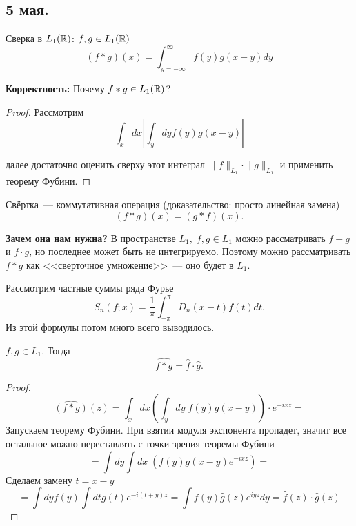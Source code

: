 \subsection{ 5 мая. }


\begin{definition}
    Сверка в $L_1(\mathbb{R})$: $f, g \in L_1(\mathbb{R})$
    \[ (f * g)(x) = \int_{y=-\infty}^{\infty} f(y)g(x-y)dy\]
\end{definition}

\begin{note}
    \textbf{Корректность:} Почему $f * g \in L_1(\mathbb{R})$?
\end{note}

\begin{proof}
Рассмотрим
\[
\int_x dx \left| \int_y dy f(y) g(x - y) \right|
\]

далее достаточно оценить сверху этот интеграл $\|f\|_{L_1} \cdot \|g\|_{L_1}$ и применить теорему Фубини.
\end{proof}

\begin{statement}
    Свёртка~--- коммутативная операция (доказательство: просто линейная замена)
    \[(f*g)(x) = (g * f)(x).\]
\end{statement}

\begin{note}
\textbf{Зачем она нам нужна?} В пространстве $L_1, \; f, g \in L_1$ можно рассматривать $f + g$ и $f \cdot g$, но последнее может быть не интегрируемо. Поэтому можно рассматривать $f * g$ как <<сверточное умножение>>~--- оно будет в $L_1$.
\end{note}

\begin{example}
    Рассмотрим частные суммы ряда Фурье \[S_n(f; x) = \frac{1}{\pi} \int_{-\pi}^{\pi}D_n(x-t)f(t)dt.\]
    Из этой формулы потом много всего выводилось.
\end{example}

\begin{theorem}
    $f,g \in L_1$. Тогда
    \[ \widehat{f * g} = \widehat{f} \cdot \widehat{g}.\]
\end{theorem}
\begin{proof}
    \[ \widehat{(f * g)}(z) = \int_x dx \left(\int_y dy \; f(y) g(x-y)\right) \cdot e^{-ixz} =\]
    Запускаем теорему Фубини. При взятии модуля экспонента пропадет, значит все остальное можно переставлять с точки зрения теоремы Фубини
    \[ = \int dy \int dx \; (f(y) g(x-y) e^{-ixz}) = \]
    Сделаем замену $t = x-y$
    \[ = \int dy f(y) \int dt g(t) e^{-i(t+y)z} = \int f(y) \widehat{g}(z) e^{iyz} dy = \widehat{f}(z) \cdot \widehat{g}(z) \]

\end{proof}

